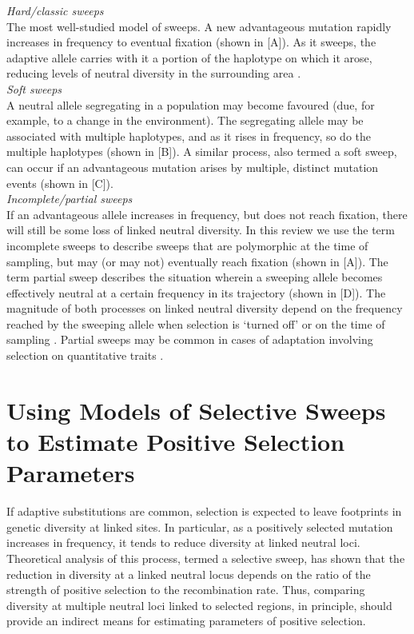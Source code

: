 \emph{Hard/classic sweeps} \\
 
The most well-studied model of sweeps. A new advantageous mutation rapidly increases in frequency to eventual fixation (shown in [A]). As it sweeps, the adaptive allele carries with it a portion of the haplotype on which it arose, reducing levels of neutral diversity in the surrounding area \citep{RN124,RN235}. \\
 
\emph{Soft sweeps} \\
  
A neutral allele segregating in a population may become favoured (due, for example, to a change in the environment). The segregating allele may be associated with multiple haplotypes, and as it rises in frequency, so do the multiple haplotypes (shown in [B]). A similar process, also termed a soft sweep, can occur if an advantageous mutation arises by multiple, distinct mutation events (shown in [C]). \\
 
\emph{Incomplete/partial sweeps} \\
 
If an advantageous allele increases in frequency, but does not reach fixation, there will still be some loss of linked neutral diversity. In this review we use the term incomplete sweeps to describe sweeps that are polymorphic at the time of sampling, but may (or may not) eventually reach fixation (shown in [A]). The term partial sweep describes the situation wherein a sweeping allele becomes effectively neutral at a certain frequency in its trajectory (shown in [D]). The magnitude of both processes on linked neutral diversity depend on the frequency reached by the sweeping allele when selection is ‘turned off’ or on the time of sampling \citep{RN226}. Partial sweeps may be common in cases of adaptation involving selection on quantitative traits \citep{RN147}. \\

\section[Estimating positive selection parameters]{Using Models of Selective Sweeps to Estimate Positive Selection Parameters}
 
If adaptive substitutions are common, selection is expected to leave footprints in genetic diversity at linked sites. In particular, as a positively selected mutation increases in frequency, it tends to reduce diversity at linked neutral loci. Theoretical analysis of this process, termed a selective sweep, has shown that the reduction in diversity at a linked neutral locus depends on the ratio of the strength of positive selection to the recombination rate. Thus, comparing diversity at multiple neutral loci linked to selected regions, in principle, should provide an indirect means for estimating parameters of positive selection.
 

